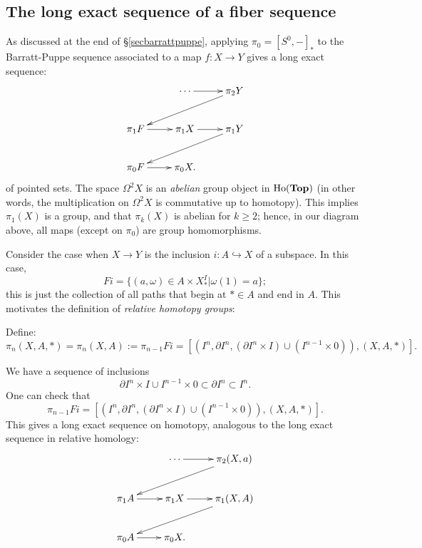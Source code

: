 \subsection{The long exact sequence of a fiber sequence}
As discussed at the end of \S \ref{secbarrattpuppe}, applying $\pi_0 = [S^0,-]_\ast$ to the
Barratt-Puppe sequence associated to a map $f:X\to Y$ gives a long exact sequence:
\begin{equation*}
    \xymatrix{
	& \cdots\ar[r] & \pi_2 Y\ar[dll]\\
	\pi_1 F\ar[r] & \pi_1 X\ar[r] & \pi_1 Y\ar[dll]\\
	\pi_0 F\ar[r] & \pi_0 X. & 
    }
\end{equation*}
of pointed sets.
The space $\Omega^2 X$ is an \emph{abelian} group object in $\mathrm{Ho}(\mathbf{Top})$
(in other words, the multiplication on $\Omega^2 X$ is commutative up to homotopy).
This implies $\pi_1(X)$ is a group, and that $\pi_k(X)$ is abelian for $k\geq 2$;
hence, in our diagram above, all maps (except on $\pi_0$) are group homomorphisms.

Consider the case when $X\to Y$ is the inclusion $i:A\hookrightarrow X$ of a subspace.
In this case,
$$Fi=\{(a,\omega)\in A\times X^I_\ast|\omega(1) = a\};$$
this is just the collection of all paths that begin at $\ast\in A$ and end in $A$.
This motivates the definition of \emph{relative homotopy groups}:
\begin{definition}
    Define: 
    $$\pi_n(X,A,\ast) = \pi_n(X,A) := \pi_{n-1}Fi = [(I^n,\partial I^n,(\partial I^n\times I)\cup (I^{n-1}\times 0)),(X,A,\ast)].$$
\end{definition}
We have a sequence of inclusions
$$\partial I^n\times I\cup I^{n-1}\times 0 \subset \partial I^n \subset I^n.$$
One can check that
$$\pi_{n-1}Fi = [(I^n,\partial I^n,(\partial I^n\times I)\cup (I^{n-1}\times 0)),(X,A,\ast)].$$
This gives a long exact sequence on homotopy, analogous to the long exact sequence in relative homology:
\begin{equation*}
    \xymatrix{
	& \cdots\ar[r] & \pi_2 (X,a)\ar[dll]\\
	\pi_1 A\ar[r] & \pi_1 X\ar[r] & \pi_1 (X,A)\ar[dll]\\
	\pi_0 A\ar[r] & \pi_0 X. & 
    }
\end{equation*}

